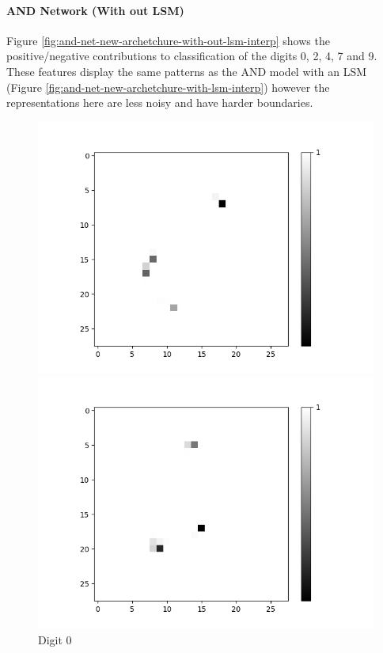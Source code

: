 \paragraph{AND Network (With out LSM)}
Figure \ref{fig:and-net-new-archetchure-with-out-lsm-interp} shows the positive/negative contributions to classification of the digits 0, 2, 4, 7 and 9. These features display the same patterns as the AND model with an LSM (Figure \ref{fig:and-net-new-archetchure-with-lsm-interp}) however the representations here are less noisy and have harder boundaries.

\begin{figure}[H]
	\centering
	\begin{minipage}[b]{0.19\textwidth}
		\captionsetup{labelformat=empty}
		\includegraphics[width=\textwidth]{AND(NO-LSM)/Positive/Layer0-Neuron-0.png}
		\caption{Digit 0}
		\label{fig:cnf-descrete-generalizatiion}
	\end{minipage}
	\begin{minipage}[b]{0.19\textwidth}
		\captionsetup{labelformat=empty}
		\includegraphics[width=\textwidth]{AND(NO-LSM)/Positive/Layer0-Neuron-2.png}

\end{minipage}
\end{figure}
